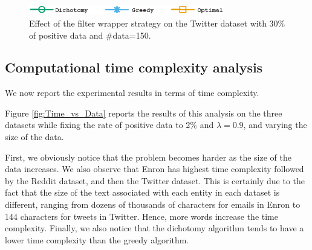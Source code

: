 \begin{figure}[H]
\begin{centering}
\includegraphics[width=8.5cm]{imgs/legend2}
\par\end{centering}
\begin{centering}
\par\end{centering}
\caption{Effect of the filter wrapper strategy on the Twitter dataset with 30\% of positive data and \#data=150.}
\label{fig:FilterWrapperStrategy}
\end{figure}



\subsection{Computational time complexity analysis}
We now report the experimental results in terms of time complexity.


 Figure \ref{fig:Time_vs_Data} reports the results of this analysis on the three datasets while fixing the rate of positive data to 2\% and $\lambda=0.9$, and  varying the size of the data.

First, we obviously notice that the problem becomes harder as the size of the data increases. We also observe that Enron has highest time complexity followed by the Reddit dataset, and then the Twitter dataset. This is certainly due to the fact that the size of the text associated with each entity in each dataset is different, ranging from dozens of thousands of characters for emails in Enron to 144 characters for tweets in Twitter. Hence, more words increase the time complexity. Finally, we also notice that the dichotomy algorithm tends to have a lower time complexity than the greedy algorithm.

